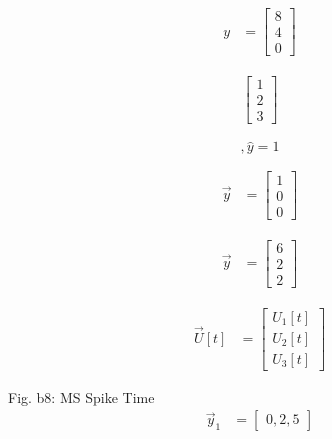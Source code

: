 \documentclass{article}
\begin{document}
  \begin{align}
    y &= \begin{bmatrix}
           8 \\
           4 \\
           0
         \end{bmatrix}
  \end{align}
  
  
  \begin{align}
    \begin{bmatrix}
           1 \\
           2 \\
           3
         \end{bmatrix}
  \end{align}
  
  
  \begin{equation}\label{beq:6}
    ,\hat{y} = 1
\end{equation}

  \begin{align}
    \vec{y} &= \begin{bmatrix}
           1 \\
           0 \\
           0
         \end{bmatrix}
  \end{align}
  
  

\begin{align}
    \vec{y} &= \begin{bmatrix}
           6 \\
           2 \\
           2
         \end{bmatrix}
  \end{align}
  

\begin{align}
    \vec{U}[t] &= \begin{bmatrix}
           U_1[t] \\
           U_2[t] \\
           U_3[t]
         \end{bmatrix}
  \end{align}
  


Fig. b8: MS Spike Time
\begin{align}
    \vec{y}_1 &= \begin{bmatrix}
           0, 2, 5
         \end{bmatrix}
  \end{align}
  
\end{document}
